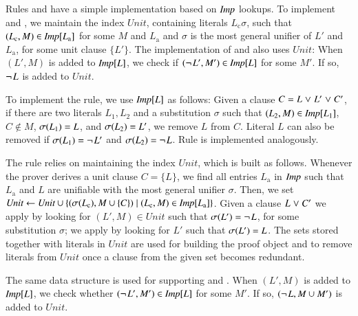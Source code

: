 \newcommand{\unitset}{\ensuremath{\textit{Unit}}}
\begin{conf} 
Rules  and  have a simple
implementation based on $\textit{Imp}$ lookups. To implement  and
, we maintain the index \unitset, containing literals
$L_\mathrm{c}\sigma$, such that $(L_\mathrm{c}, M) \in \textit{Imp}[L_\mathrm{a}]$ for
some $M$ and $L_\mathrm{a}$ and $\sigma$ is the most general unifier of $L'$ and
$L_\mathrm{a}$, for some unit clause $\{ L' \}$. The implementation
of  and  also uses \unitset:
When $(L',M)$ is added to $\textit{Imp}[L]$, we
check if $(\neg{\kern.2ex L'},M') \in \textit{Imp}[L]$ for some $M'$. If so, $\neg{\kern.2ex L}$
is added to $\unitset$.
\end{conf}
\begin{rep}
   
   To implement the  rule, we use $\textit{Imp}[L]$ as
   follows: Given a clause $C = L \mathrel{\lor} L' \mathrel{\lor} C'$, if there are two literals
   $L_1,L_2$ and a substitution $\sigma$ such that $(L_2, M) \in \textit{Imp}[L_1]$,
   $C \not\in M$,  $\sigma(L_1) = L$, and $\sigma(L_2) = L'$, we remove $L$ from $C$.
   Literal $L$ can also be removed if $\sigma(L_1) = \neg{\kern.2ex L'}$ and $\sigma(L_2) = \neg{\kern.2ex L}$. 
   Rule  is implemented analogously.

   The  rule relies on maintaining the index $\unitset$, which is
   built as follows. Whenever the prover derives a unit clause $C = \{ L \}$, we
   find all entries $L_\mathrm{a}$ in $\textit{Imp}$ such that $L_\mathrm{a}$ and $L$
   are unifiable with the most general unifier $\sigma$. Then, we set $\unitset
   \gets \unitset \cup \{ (\sigmaterm{L_\mathrm{c}}, M \cup \{ C \} ) \mid
   (L_\mathrm{c}, M) \in \impmap[L_\mathrm{a}] \}$. Given a clause $L \mathrel{\lor} C'$
   we apply  by looking for $(L', M) \in \unitset$ such that
   $\sigma(L') = \neg{\kern.2ex L}$, for some substitution $\sigma$; we apply
    by looking for $L'$ such that $\sigma(L') = L$.  The sets
   stored together with literals in $\unitset$ are used for building the proof
   object and to remove literals from $\unitset$ once a clause from the given
   set becomes redundant.

   The same data structure is used
   for supporting  and . When $(L',M)$ is added to $\textit{Imp}[L]$, we
   check whether $(\neg{\kern.2ex L'},M') \in \textit{Imp}[L]$ for some $M'$. If so, $(\neg{\kern.2ex L}, M \cup M')$
   is added to $\unitset$.
\end{rep}


